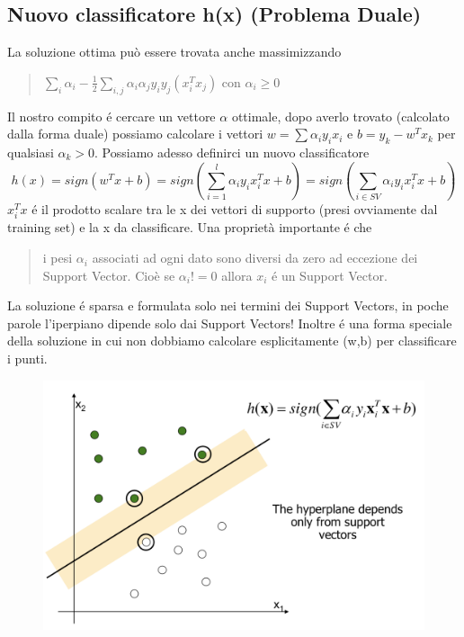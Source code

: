 \documentclass{article}
\begin{document}
\subsection{Nuovo classificatore h(x) (Problema Duale)}
La soluzione ottima può essere trovata anche massimizzando
\begin{quote}
    $\sum_i \alpha_i - \frac{1}{2}\sum_{i,j} \alpha_i\alpha_j y_i y_j (x_i^T x_j)$ con $\alpha_i \geq 0$
\end{quote}
Il nostro compito é cercare un vettore $\alpha$ ottimale, dopo averlo trovato (calcolato dalla forma duale) possiamo calcolare i vettori $w=\sum \alpha_iy_ix_i$ e $b=y_k-w^Tx_k$ per qualsiasi $\alpha_k >0$. Possiamo adesso definirci un nuovo classificatore 
\begin{equation}
    h(x)=sign(w^Tx+b)=sign(\sum_{i=1}^l \alpha_iy_ix_i^Tx+b)=sign(\sum_{i \in SV} \alpha_iy_ix_i^T x+b)
\end{equation}
$x_i^Tx$ é il prodotto scalare tra le x dei vettori di supporto (presi ovviamente dal training set) e la x da classificare. Una proprietà importante é che
\begin{quote}
    i pesi $\alpha_i$ associati ad ogni dato sono diversi da zero ad eccezione dei Support Vector. Cioè se $\alpha_i!=0$ allora $x_i$ é un Support Vector.
\end{quote}
La soluzione é sparsa e formulata solo nei termini dei Support Vectors, in poche parole l'iperpiano dipende solo dai Support Vectors! Inoltre é una forma speciale della soluzione in cui non dobbiamo calcolare esplicitamente (w,b) per classificare i punti.
\begin{figure}[H]
\centering
\includegraphics[scale=0.4]{Images/hyperplanesv.png}
\end{figure}
\end{document}
